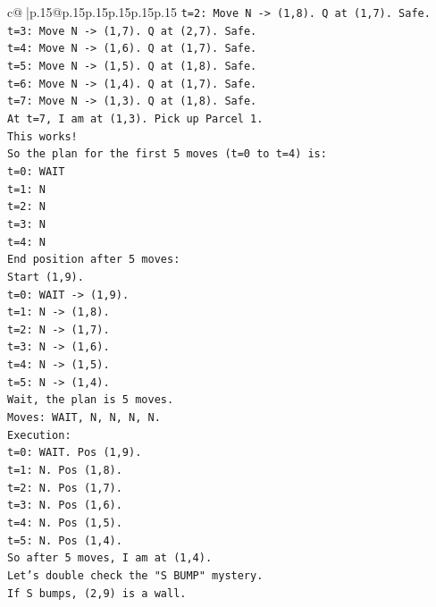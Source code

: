 \documentclass{article}
\begin{document}
{\begin{supertabular}{c@{$\;$}|p{.15\linewidth}@{}p{.15\linewidth}p{.15\linewidth}p{.15\linewidth}p{.15\linewidth}p{.15\linewidth}}
{{{\texttt{t=2: Move N {-}> (1,8). Q at (1,7). Safe.} \\
\texttt{t=3: Move N {-}> (1,7). Q at (2,7). Safe.} \\
\texttt{t=4: Move N {-}> (1,6). Q at (1,7). Safe.} \\
\texttt{t=5: Move N {-}> (1,5). Q at (1,8). Safe.} \\
\texttt{t=6: Move N {-}> (1,4). Q at (1,7). Safe.} \\
\texttt{t=7: Move N {-}> (1,3). Q at (1,8). Safe.} \\
\texttt{At t=7, I am at (1,3). Pick up Parcel 1.} \\
\texttt{This works!} \\
\texttt{So the plan for the first 5 moves (t=0 to t=4) is:} \\
\texttt{t=0: WAIT} \\
\texttt{t=1: N} \\
\texttt{t=2: N} \\
\texttt{t=3: N} \\
\texttt{t=4: N} \\
\texttt{End position after 5 moves:} \\
\texttt{Start (1,9).} \\
\texttt{t=0: WAIT {-}> (1,9).} \\
\texttt{t=1: N {-}> (1,8).} \\
\texttt{t=2: N {-}> (1,7).} \\
\texttt{t=3: N {-}> (1,6).} \\
\texttt{t=4: N {-}> (1,5).} \\
\texttt{t=5: N {-}> (1,4).} \\
\texttt{Wait, the plan is 5 moves.} \\
\texttt{Moves: WAIT, N, N, N, N.} \\
\texttt{Execution:} \\
\texttt{t=0: WAIT. Pos (1,9).} \\
\texttt{t=1: N. Pos (1,8).} \\
\texttt{t=2: N. Pos (1,7).} \\
\texttt{t=3: N. Pos (1,6).} \\
\texttt{t=4: N. Pos (1,5).} \\
\texttt{t=5: N. Pos (1,4).} \\
\texttt{So after 5 moves, I am at (1,4).} \\
\texttt{Let's double check the "S BUMP" mystery.} \\
\texttt{If S bumps, (2,9) is a wall.} \\
}}}
\end{supertabular}}
\end{document}

